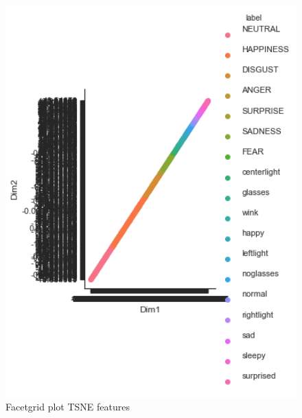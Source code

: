 \documentclass[12pt]{article}
\newenvironment{problem}[2][Problem]{\begin{trivlist}
\item[\hskip \labelsep {\bfseries #1}\hskip \labelsep {\bfseries #2.}]}{\end{trivlist}}
\begin{document}
\begin{problem}{4}
	\begin{figure}[H]
	\centering
	\includegraphics[width=16cm]{Emotion_Classification_TSNE.png}
	\caption{Facetgrid plot TSNE features}
	\label{fig:verticalcell}
\end{figure}


\end{problem}





\pagebreak
\end{document}
